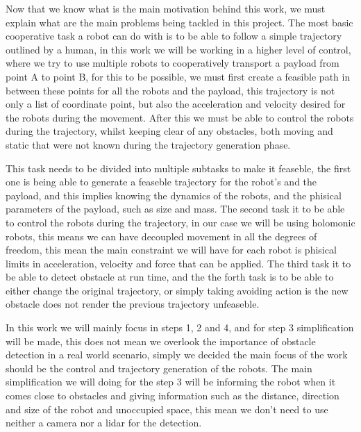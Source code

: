 Now that we know what is the main motivation behind this work, we must explain what are the main problems being tackled in this project. The most basic cooperative task a robot can do with is to be able to follow a simple trajectory outlined by a human, in this work we will be working in a higher level of control, where we try to use multiple robots to cooperatively transport a payload from point A to point B, for this to be possible, we must first create a feasible path in between these points for all the robots and the payload, this trajectory is not only a list of coordinate point, but also the acceleration and velocity desired for the robots during the movement. After this we must be able to control the robots during the trajectory, whilst keeping clear of any obstacles, both moving and static that were not known during the trajectory generation phase. 

This task needs to be divided into multiple subtasks to make it feaseble, the first one is being able to generate a feaseble trajectory for the robot's and the payload, and this implies knowing the dynamics of the robots, and the phisical parameters of the payload, such as size and mass. The second task it to be able to control the robots during the trajectory, in our case we will be using holomonic robots, this means we can have decoupled movement in all the degrees of freedom, this mean the main constraint we will have for each robot is phisical limits in acceleration, velocity and force that can be applied. The third task it to be able to detect obstacle at run time, and the the forth task is to be able to either change the original trajectory, or simply taking avoiding action is the new obstacle does not render the previous trajectory unfeaseble.

In this work we will mainly focus in steps 1, 2 and 4, and for step 3 simplification will be made, this does not mean we overlook the importance of obstacle detection in a real world scenario, simply we decided the main focus of the work should be the control and trajectory generation of the robots. The main simplification we will doing for the step 3 will be informing the robot when it comes close to obstacles and giving information such as the distance, direction and size of the robot and unoccupied space, this mean we don't need to use neither a camera nor a lidar for the detection.

